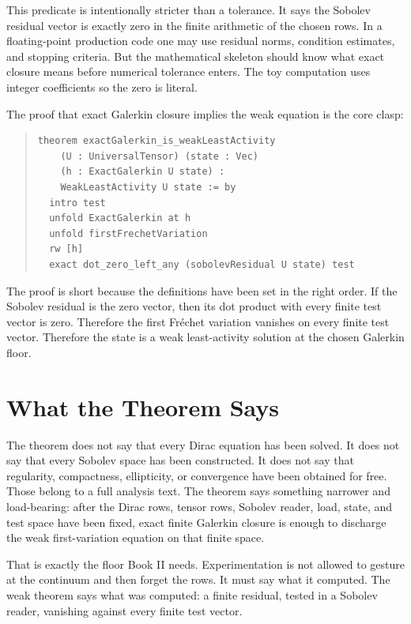 This predicate is intentionally stricter than a tolerance. It says the Sobolev residual vector is exactly zero
in the finite arithmetic of the chosen rows. In a floating-point production code one may use residual norms,
condition estimates, and stopping criteria. But the mathematical skeleton should know what exact closure means
before numerical tolerance enters. The toy computation uses integer coefficients so the zero is literal.

The proof that exact Galerkin closure implies the weak equation is the core clasp:

\begin{quote}\small
\begin{verbatim}
theorem exactGalerkin_is_weakLeastActivity
    (U : UniversalTensor) (state : Vec)
    (h : ExactGalerkin U state) :
    WeakLeastActivity U state := by
  intro test
  unfold ExactGalerkin at h
  unfold firstFrechetVariation
  rw [h]
  exact dot_zero_left_any (sobolevResidual U state) test
\end{verbatim}
\end{quote}

The proof is short because the definitions have been set in the right order. If the Sobolev residual is the zero
vector, then its dot product with every finite test vector is zero. Therefore the first Fréchet variation
vanishes on every finite test vector. Therefore the state is a weak least-activity solution at the chosen
Galerkin floor.

\section{What the Theorem Says}

The theorem does not say that every Dirac equation has been solved. It does not say that every Sobolev space has
been constructed. It does not say that regularity, compactness, ellipticity, or convergence have been obtained
for free. Those belong to a full analysis text. The theorem says something narrower and load-bearing: after the
Dirac rows, tensor rows, Sobolev reader, load, state, and test space have been fixed, exact finite Galerkin
closure is enough to discharge the weak first-variation equation on that finite space.

That is exactly the floor Book II needs. Experimentation is not allowed to gesture at the continuum and then
forget the rows. It must say what it computed. The weak theorem says what was computed: a finite residual,
tested in a Sobolev reader, vanishing against every finite test vector.

